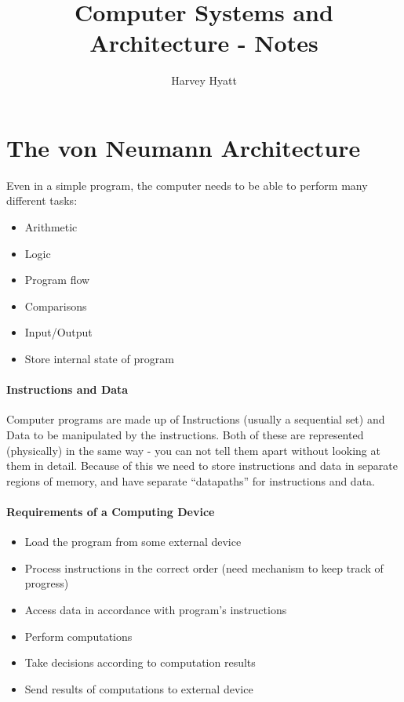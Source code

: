 \documentclass{article}
\title{Computer Systems and Architecture - Notes}
\author{Harvey Hyatt}
\date{}
\begin{document}
\maketitle

\section{The von Neumann Architecture}
Even in a simple program, the computer needs to be able to perform many different tasks:
\begin{itemize}
\item Arithmetic
\item Logic
\item Program flow
\item Comparisons
\item Input/Output
\item Store internal state of program
\end{itemize}

\paragraph{Instructions and Data} Computer programs are made up of Instructions (usually a sequential set) and Data to be manipulated by the instructions.
\vspace{1mm}
Both of these are represented (physically) in the same way - you can not tell them apart without looking at them in detail. Because of this we need to store instructions and data in separate regions of memory, and have separate ``datapaths'' for instructions and data.

\paragraph{Requirements of a Computing Device}
\begin{itemize}
\item Load the program from some external device
\item Process instructions in the correct order (need mechanism to keep track of progress)
\item Access data in accordance with program's instructions
\item Perform computations
\item Take decisions according to computation results
\item Send results of computations to external device
\end{itemize}
\end{document}
